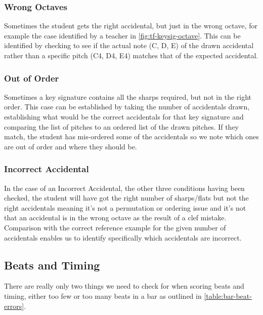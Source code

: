 \subsubsection{Wrong Octaves}\label{sec:scoring-keysig-octave}

Sometimes the student gets the right accidental, but just in the wrong octave, for example the case identified by a teacher in \cref{fig:tf-keysig-octave}. This can be identified by checking to see if the actual note (C, D, E) of the drawn accidental rather than a specific pitch (C4, D4, E4) matches that of the expected accidental.

\subsubsection{Out of Order}\label{sec:scoring-keysig-order}

Sometimes a key signature contains all the sharps required, but not in the right order. This case can be established by taking the number of accidentals drawn, establishing what would be the correct accidentals for that key signature and comparing the list of pitches to an ordered list of the drawn pitches. If they match, the student has mis-ordered some of the accidentals so we note which ones are out of order and where they should be.

\subsubsection{Incorrect Accidental}\label{sec:scoring-keysig-incorrect}

In the case of an Incorrect Accidental, the other three conditions having been checked, the student will have got the right number of sharps/flats but not the right accidentals meaning it's not a permutation or ordering issue and it's not that an accidental is in the wrong octave as the result of a clef mistake. Comparison with the correct reference example for the given number of accidentals enables us to identify specifically which accidentals are incorrect.

\subsection{Beats and Timing}\label{sec:scoring-beats}

There are really only two things we need to check for when scoring beats and timing, either too few or too many beats in a bar as outlined in \cref{table:bar-beat-errors}.


